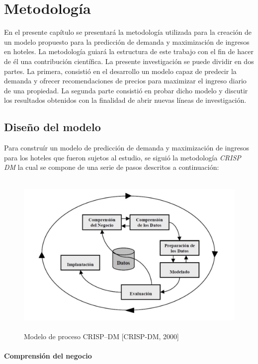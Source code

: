\chapter{Metodología}
\label{ch:metodologia}

En el presente capítulo se presentará la metodología utilizada para la creación de un modelo propuesto para la predicción de demanda y maximización de ingresos en hoteles. La metodología guiará la estructura de este trabajo con el fin de hacer de él una contribución científica. La presente investigación se puede dividir en dos partes. La primera, consistió en el desarrollo un modelo capaz de predecir la demanda y ofrecer recomendaciones de precios para maximizar el ingreso diario de una propiedad. La segunda parte consistió en probar dicho modelo y discutir los resultados obtenidos con la finalidad de abrir nuevas líneas de investigación.

\section*{Diseño del modelo}

Para construír un modelo de predicción de demanda y maximización de ingresos para los hoteles que fueron sujetos al estudio, se siguió la metodología \emph{CRISP DM} la cual se compone de una serie de pasos descritos a continuación:

\begin{figure}[H]
  \centering
      \includegraphics[width=\maxwidth,height=8cm]{figures/crisp.png} 
  \caption{Modelo de proceso CRISP–DM [CRISP-DM, 2000]}
\end{figure}

\subsubsection*{Comprensión del negocio}

